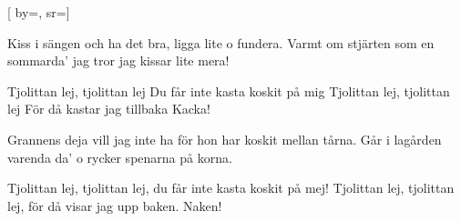 [
    by={},
    sr={}]

\beginverse
Kiss i sängen och ha det bra,
ligga lite o fundera.
Varmt om stjärten som en sommarda’
jag tror jag kissar lite mera!
\endverse

\beginchorus
Tjolittan lej, tjolittan lej
Du får inte kasta koskit på mig
Tjolittan lej, tjolittan lej
För då kastar jag tillbaka
Kacka!
\endchorus

\beginverse
Grannens deja vill jag inte ha
för hon har koskit mellan tårna.
Går i lagården varenda da’
o rycker spenarna på korna.
\endverse

\beginchorus
Tjolittan lej, tjolittan lej,
du får inte kasta koskit på mej!
Tjolittan lej, tjolittan lej,
för då visar jag upp baken.
Naken!
\endchorus
\endsong